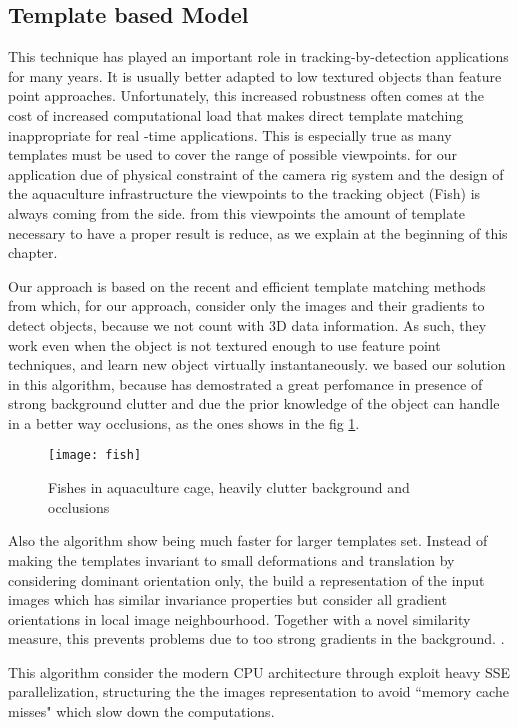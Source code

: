 \subsection{Template based Model}
This technique has played an important role in tracking-by-detection applications for
many years. It is usually better adapted to low textured objects than feature point approaches. 
Unfortunately, this increased robustness often comes at the cost of
increased computational load that makes direct template matching inappropriate 
for real -time applications. This is especially true as many templates must be 
used to cover the range of possible viewpoints. for our application due of physical 
constraint of the camera rig system and the design of the aquaculture infrastructure
the viewpoints to the tracking object (Fish) is always coming from the side.
from this viewpoints the amount of template necessary to have a proper result is reduce, as we explain at the beginning of this chapter. 

Our approach is based on the recent and efficient template matching methods from
\citet{Hinterstoisser2011, Hinterstoisser2012} which, for our approach, consider only the images and their
gradients to detect objects, because we not count with 3D data information.
As such, they work even when the object is not textured 
enough to use feature point techniques, and learn new object virtually instantaneously.
we based our solution in this algorithm, because has demostrated a great perfomance
in presence of strong background clutter and due the prior knowledge of the object
can handle in a better way occlusions, as the ones shows in the fig \ref{fig:clutter}.


\begin{figure}[ht]
\centering
\texttt{[image: fish]}
\caption{Fishes in aquaculture cage, heavily clutter background and occlusions}
\label{fig:clutter}
\end{figure}

Also the algorithm show being much faster for larger templates set. Instead of 
making the templates invariant to small deformations and translation by considering
dominant orientation only, the build a representation of the input images which has
similar invariance properties but consider all gradient orientations in local image
neighbourhood. Together with a novel similarity measure, this prevents problems due
to too strong gradients in the background. .

This algorithm consider the modern CPU architecture through exploit heavy SSE parallelization, 
structuring the the images 
representation to  avoid ``memory cache misses" which slow down the computations.

